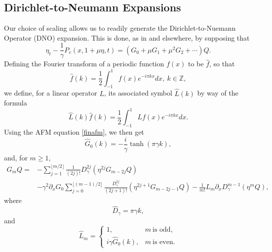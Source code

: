 \documentclass[a4paper,11pt]{article}
\newcommand{\ba}{\begin{array}}
\newcommand{\ea}{\end{array}}
\newcommand{\p}{\partial}
\begin{document}
\subsection{Dirichlet-to-Neumann Expansions}
Our choice of scaling allows us to readily generate the Dirichlet-to-Nuemann Operator (DNO) expansion.  This is done, as in \cite{craig} and elsewhere, by supposing that 
\[
\eta_{t} - \frac{1}{\gamma}P_{v}(x,1+\mu \eta,t) = \left(G_{0} + \mu G_{1} + \mu^{2}  G_{2} + \cdots \right)Q.
\]
Defining the Fourier transform of a periodic function $f(x)$ to be $\hat{f}$, so that 
\[
\hat{f}(k) = \frac{1}{2}\int_{-1}^{1}f(x)e^{-i\pi k x} dx, ~ k\in \mathbb{Z},
\]
we define, for a linear operator $L$, its associated symbol $\hat{L}(k)$ by way of the formula 
\[
\hat{L}(k)\hat{f}(k) = \frac{1}{2}\int_{-1}^{1} Lf(x) e^{-i\pi k x}dx.
\]
Using the AFM equation \eqref{finafm}, we then get 
\[
\hat{G}_{0}(k) = -\frac{i}{\gamma}\tanh(\pi \gamma k),
\]
and, for $m\geq 1$, 
\begin{align*}
G_{m}Q = & -\sum_{j=1}^{\lfloor{m/2}\rfloor}\frac{1}{(2j)!}D^{2j}_{\gamma}\left(\eta^{2j}G_{m-2j}Q\right) \\
& - \gamma^{2}\p_{x}G_{0} \sum_{j=0}^{\lfloor{(m-1)/2}\rfloor}\frac{D_{\gamma}^{2j}}{(2j+1)!}\left(\eta^{2j+1}G_{m-2j-1}Q\right) - \frac{1}{m!}L_{m} \p_{x}D_{\gamma}^{m-1}\left(\eta^{m}Q \right),
\end{align*}
where
\[
\hat{D}_{\gamma} = \pi \gamma k,
\]
and
\[
\hat{L}_{m} = \left\{
\ba{rl}
1,  & m~\mbox{is odd}, \\
i\gamma \hat{G}_{0}(k),  & m~\mbox{is even}.
\ea
\right.
\]

\end{document}
